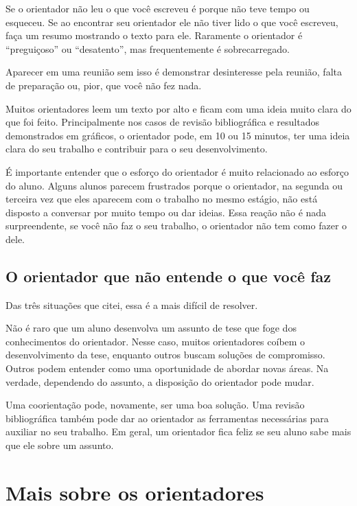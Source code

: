 Se o orientador não leu o que você escreveu é porque não teve tempo ou esqueceu. Se ao encontrar seu orientador ele não tiver lido o que você escreveu, faça um resumo mostrando o texto para ele. Raramente o orientador é ``preguiçoso'' ou ``desatento'', mas frequentemente é sobrecarregado. 




Aparecer em uma reunião sem isso é demonstrar desinteresse pela reunião, falta de preparação ou, pior, que você não fez nada.

Muitos orientadores leem um texto por alto e ficam com uma ideia muito clara do que foi feito. Principalmente nos casos de revisão bibliográfica e resultados demonstrados em gráficos, o orientador pode, em 10 ou 15 minutos, ter uma ideia clara do seu trabalho e contribuir para o seu desenvolvimento. 


É importante entender que o esforço do orientador é muito relacionado ao esforço do aluno. Alguns alunos parecem frustrados porque o orientador, na segunda ou terceira vez que eles aparecem com o trabalho no mesmo estágio, não está disposto a conversar por muito tempo ou dar ideias. Essa reação não é nada surpreendente, se você não faz o seu trabalho, o orientador não tem como fazer o dele.




\subsection{O orientador que não entende o que você faz}

Das três situações que citei, essa é a mais difícil de resolver.

Não é raro que um aluno desenvolva um assunto de tese que foge dos conhecimentos do orientador. Nesse caso, muitos orientadores coíbem o desenvolvimento da tese, enquanto outros buscam soluções de compromisso. Outros podem entender como uma oportunidade de abordar novas áreas. Na verdade, dependendo do assunto, a disposição do orientador pode mudar.

Uma coorientação pode, novamente, ser uma boa solução. Uma revisão bibliográfica também pode dar ao orientador as ferramentas necessárias para auxiliar no seu trabalho. Em geral, um orientador fica feliz se seu aluno sabe mais que ele sobre um assunto.


\section{Mais sobre os orientadores}


